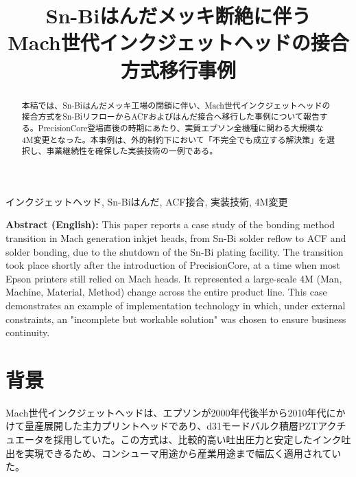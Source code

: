 \documentclass[conference]{IEEEtran}
\begin{document}
\title{Sn-Biはんだメッキ断絶に伴う\\Mach世代インクジェットヘッドの接合方式移行事例}

\author{%
}

\maketitle

\begin{abstract}
本稿では、Sn-Biはんだメッキ工場の閉鎖に伴い、Mach世代インクジェットヘッドの接合方式をSn-BiリフローからACFおよびはんだ接合へ移行した事例について報告する。PrecisionCore登場直後の時期にあたり、実質エプソン全機種に関わる大規模な4M変更となった。本事例は、外的制約下において「不完全でも成立する解決策」を選択し、事業継続性を確保した実装技術の一例である。
\end{abstract}

\begin{IEEEkeywords}
インクジェットヘッド, Sn-Biはんだ, ACF接合, 実装技術, 4M変更
\end{IEEEkeywords}

\vspace{1em}
\noindent
\textbf{Abstract (English):}  
This paper reports a case study of the bonding method transition in Mach generation inkjet heads, from Sn-Bi solder reflow to ACF and solder bonding, due to the shutdown of the Sn-Bi plating facility.  
The transition took place shortly after the introduction of PrecisionCore, at a time when most Epson printers still relied on Mach heads.  
It represented a large-scale 4M (Man, Machine, Material, Method) change across the entire product line.  
This case demonstrates an example of implementation technology in which, under external constraints, an "incomplete but workable solution" was chosen to ensure business continuity.

\section{背景}
Mach世代インクジェットヘッドは、エプソンが2000年代後半から2010年代にかけて量産展開した主力プリントヘッドであり、d31モードバルク積層PZTアクチュエータを採用していた。この方式は、比較的高い吐出圧力と安定したインク吐出を実現できるため、コンシューマ用途から産業用途まで幅広く適用されていた。  
\end{document}
